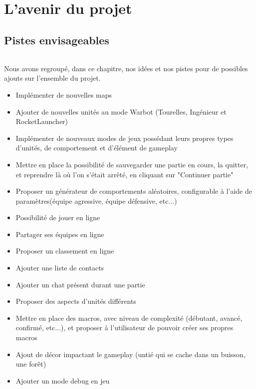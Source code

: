 \documentclass{report}
\begin{document}
\newpage
\part{L'avenir du projet}
\chapter{Pistes envisageables}
\paragraph{} Nous avons regroupé, dans ce chapitre, nos idées et nos pistes pour de possibles ajouts sur l'ensemble du projet.
\begin{itemize}
\item Implémenter de nouvelles maps
\item Ajouter de nouvelles unités au mode Warbot (Tourelles, Ingénieur et RocketLauncher)
\item Implémenter de nouveaux modes de jeux possédant leurs propres types d'unités, de comportement et d'élément de gameplay
\item Mettre en place la possibilité de sauvegarder une partie en cours, la quitter, et reprendre là où l'on s'était arrêté, en cliquant sur "Continuer partie"
\item Proposer un générateur de comportements aléatoires, configurable à l'aide de paramètres(équipe agressive, équipe défensive, etc...)
\item Possibilité de jouer en ligne
\item Partager ses équipes en ligne
\item Proposer un classement en ligne
\item Ajouter une liste de contacts
\item Ajouter un chat présent durant une partie
\item Proposer des aspects d'unités différents
\item Mettre en place des macros, avec niveau de complexité (débutant, avancé, confirmé, etc...), et proposer à l'utilisateur de pouvoir créer ses propres macros
\item Ajout de décor impactant le gameplay (untié qui se cache dans un buisson, une forêt)
\item Ajouter un mode debug en jeu
\end{itemize}
\end{document}

